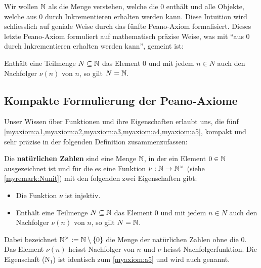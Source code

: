 \noindent
Wir wollen $\mathbb{N}$ als die Menge verstehen, welche die $0$ enthält und alle Objekte, welche aus $0$ durch Inkrementieren erhalten werden kann. Diese Intuition wird schliesslich auf geniale Weise durch das fünfte Peano-Axiom formalisiert. Dieses letzte Peano-Axiom formuliert auf mathematisch präzise Weise, was mit \enquote{aus $0$ durch Inkrementieren erhalten werden kann}, gemeint ist:
\begin{myaxiom}\label{myaxiom:a5}
	Enthält eine Teilmenge $N\subseteq\mathbb{N}$ das Element $0$ und mit jedem $n\in N$ auch den Nachfolger $\nu(n)$ von $n$, so gilt $N=\mathbb{N}$.
\end{myaxiom}

\subsection{Kompakte Formulierung der Peano-Axiome}\label{subsec:kompakt}
Unser Wissen über Funktionen und ihre Eigenschaften erlaubt uns, die fünf \cref{myaxiom:a1,myaxiom:a2,myaxiom:a3,myaxiom:a4,myaxiom:a5}, kompakt und sehr präzise in der folgenden Definition zusammenzufassen:
\begin{mydefinition}\label{mydefinition:N}
Die \textbf{natürlichen Zahlen} sind eine Menge $\mathbb{N}$, in der ein Element $0\in\mathbb{N}$ ausgezeichnet ist und für die es eine Funktion $\nu:\mathbb{N}\to\mathbb{N}^{\times}$ (siehe \cref{myremark:Nunit}) mit den folgenden zwei Eigenschaften gibt:
\begin{itemize}
	\item[(N$_0$)] Die Funktion $\nu$ ist injektiv.
	\item[(N$_1$)] Enthält eine Teilmenge $N\subseteq\mathbb{N}$ das Element $0$ und mit jedem $n\in N$ auch den Nachfolger $\nu(n)$ von $n$, so gilt $N=\mathbb{N}$.
\end{itemize}
\end{mydefinition}
Dabei bezeichnet $\mathbb{N}^{\times}:=\mathbb{N}\setminus{\left\{0\right\}}$ die Menge der natürlichen Zahlen ohne die $0$. Das Element $\nu(n)$ heisst Nachfolger von $n$ und $\nu$ heisst Nachfolgerfunktion. Die Eigenschaft (N$_1$) ist identisch zum \cref{myaxiom:a5} und wird auch  genannt.

